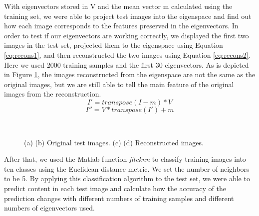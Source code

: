 \documentclass[UTF8,12pt]{article}
\begin{document}
	With eigenvectors stored in V and the mean vector m calculated using the training set, we were able to project test images into the eigenspace and find out how each image corresponds to the features preserved in the eigenvectors. In order to test if our eigenvectors are working correctly, we displayed the first two images in the test set, projected them to the eigenspace using Equation \ref{eq:recons1}, and then reconstructed the two images using Equation \ref{eq:recons2}. Here we used 2000 training samples and the first 30 eigenvectors. As is depicted in Figure \ref{fig:recons}, the images reconstructed from the eigenspace are not the same as the original images, but we are still able to tell the main feature of the original images from the reconstruction.
	\begin{equation}
	\label{eq:recons1}
	I' = transpose(I-m)*V
	\end{equation}
	\begin{equation}
	\label{eq:recons2}
	I'' = V*transpose(I')+m
	\end{equation}
	\begin{figure}[!ht]
		\centering
		\quad
		\\
		\quad
		\caption{\label{fig:recons}(a) (b) Original test images. (c) (d) Reconstructed images.}
	\end{figure}

	After that, we used the Matlab function \textit{fitcknn} to classify training images into ten classes using the Euclidean distance metric. We set the number of neighbors to be 5. By applying this classification algorithm to the test set, we were able to predict content in each test image and calculate how the accuracy of the prediction changes with different numbers of training samples and different numbers of eigenvectors used.
\end{document}
